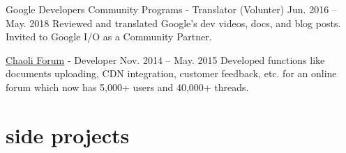 \documentclass[hidelinks__VERSION__]{adamyi-cv}
\begin{document}
\begin{entrylist}

\entry
{Google Developers Community Programs - Translator (Volunter)}
{Jun. 2016 -- May. 2018}
{Reviewed and translated Google's dev videos, docs, and blog posts. Invited to Google I/O as a Community Partner.}


\entry
{\href{https://chaoli.club}{Chaoli Forum} - Developer}
{Nov. 2014 -- May. 2015}
{Developed functions like documents uploading, CDN integration, customer feedback, etc. for an online forum which now has 5,000+ users and 40,000+ threads.}

\end{entrylist}


\section{side projects}
\end{document}
